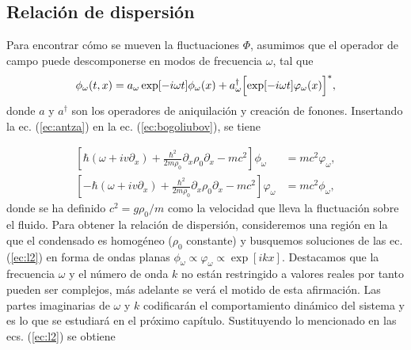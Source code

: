 \subsection{Relaci\'{o}n de dispersi\'{o}n}\label{fluctuacion}
Para encontrar c\'{o}mo se mueven la fluctuaciones $\Phi$, asumimos que el operador de campo puede descomponerse en modos de frecuencia $\omega$, tal que
\begin{equation}\label{ec:antza}
\phi_{\omega}(t,x)=a_{\omega}\exp[-i\omega t]\phi_{\omega}(x)+a^{\dagger}_{\omega}\Bigl[\exp[-i\omega t]\varphi_{\omega}(x)\Bigr]^{*},
\end{equation}
donde $a$ y $a^{\dagger}$ son los operadores de aniquilación y creación de fonones. Insertando  la ec. (\ref{ec:antza}) en la ec. (\ref{ec:bogoliubov}), se tiene

\begin{align}\label{ec:l2}
\nonumber \left[\hbar(\omega+iv\partial_x)+\frac{\hbar^2}{2m\rho_0}\partial_x\rho_0\partial_x-mc^2\right]\phi_{\omega}&=mc^2\varphi_{\omega},\\
\left[-\hbar(\omega+iv\partial_x)+\frac{\hbar^2}{2m\rho_0}\partial_x\rho_0\partial_x-mc^2\right]\varphi_{\omega}&=mc^2\phi_{\omega},
\end{align}
donde se ha definido $c^2=g\rho_0/m$ como la velocidad que lleva la fluctuaci\'{o}n sobre el fluido. Para obtener la relaci\'{o}n de dispersi\'{o}n, consideremos una región en la que el condensado es homogéneo ($\rho_0$ constante) y busquemos soluciones de las ec. (\ref{ec:l2}) en forma de ondas planas $\phi_{\omega}\propto \varphi_{\omega} \propto\exp[ikx]$. Destacamos que la frecuencia $\omega$ y
el número de onda $k$ no están restringido a valores reales por tanto pueden ser complejos, m\'{a}s adelante se ver\'{a} el motido de esta afirmaci\'{o}n. Las partes imaginarias de $\omega$ y $k$ codificarán el comportamiento dinámico del sistema y es lo que se estudiar\'{a} en el pr\'{o}ximo cap\'{i}tulo. Sustituyendo lo mencionado en las ecs. (\ref{ec:l2}) se obtiene

